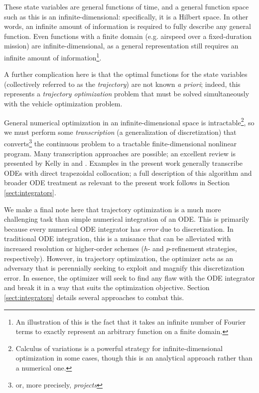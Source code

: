 These state variables are general functions of time, and a general function space such as this is an infinite-dimensional: specifically, it is a Hilbert space. In other words, an infinite amount of information is required to fully describe any general function. Even functions with a finite domain (e.g. airspeed over a fixed-duration mission) are infinite-dimensional, as a general representation still requires an infinite amount of information\footnote{An illustration of this is the fact that it takes an infinite number of Fourier terms to exactly represent an arbitrary function on a finite domain.}.

A further complication here is that the optimal functions for the state variables (collectively referred to as the \textit{trajectory}) are not known \textit{a priori}; indeed, this represents a \textit{trajectory optimization} problem that must be solved simultaneously with the vehicle optimization problem.

General numerical optimization in an infinite-dimensional space is intractable\footnote{Calculus of variations is a powerful strategy for infinite-dimensional optimization in some cases, though this is an analytical approach rather than a numerical one.}, so we must perform some \textit{transcription} (a generalization of discretization) that converts\footnote{or, more precisely, \textit{projects}} the continuous problem to a tractable finite-dimensional nonlinear program. Many transcription approaches are possible; an excellent review is presented by Kelly in \cite{mpk2015} and \cite{mpk2017}. Examples in the present work generally transcribe ODEs with direct trapezoidal collocation; a full description of this algorithm and broader ODE treatment as relevant to the present work follows in Section \ref{sect:integrators}.

We make a final note here that trajectory optimization is a much more challenging task than simple numerical integration of an ODE. This is primarily because every numerical ODE integrator has \textit{error} due to discretization. In traditional ODE integration, this is a nuisance that can be alleviated with increased resolution or higher-order schemes ($h$- and $p$-refinement strategies, respectively). However, in trajectory optimization, the optimizer acts as an adversary that is perennially seeking to exploit and magnify this discretization error. In essence, the optimizer will seek to find any flaw with the ODE integrator and break it in a way that suits the optimization objective. Section \ref{sect:integrators} details several approaches to combat this.

